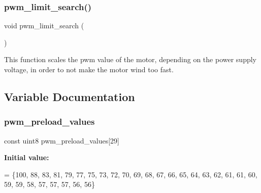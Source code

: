 \subsubsection{pwm\+\_\+limit\+\_\+search()}
{\footnotesize\ttfamily void pwm\+\_\+limit\+\_\+search (\begin{DoxyParamCaption}{ }\end{DoxyParamCaption})}

This function scales the pwm value of the motor, depending on the power supply voltage, in order to not make the motor wind too fast. 

\subsection{Variable Documentation}
\mbox{\label{interruptions_8c_aee1865719263cf20251f918e8825703d}} 
\subsubsection{pwm\+\_\+preload\+\_\+values}
{\footnotesize\ttfamily const uint8 pwm\+\_\+preload\+\_\+values[29]\hspace{0.3cm}{\ttfamily [static]}}

{\bfseries Initial value\+:}
\begin{DoxyCode}
= \{100,    
                                              88,    
                                              83,    
                                              81,    
                                              79,    
                                              77,    
                                              75,    
                                              73,    
                                              72,    
                                              70,    
                                              69,    
                                              68,    
                                              67,    
                                              66,    
                                              65,    
                                              64,    
                                              63,    
                                              62,    
                                              61,    
                                              61,    
                                              60,    
                                              59,    
                                              59,    
                                              58,    
                                              57,    
                                              57,    
                                              57,    
                                              56,    
                                              56\}
\end{DoxyCode}
